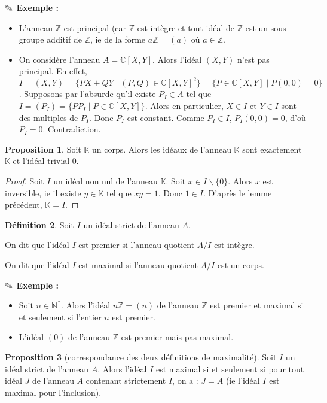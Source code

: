 \documentclass{report}
\newcommand{\Z}{\mathbb{Z}}
\newcommand{\C}{\mathbb{C}}
\newcommand{\K}{\mathbb{K}}
\newcommand{\N}{\mathbb{N}}
\theoremstyle{definition}
\newtheorem{defi}{Définition}[chapter]
\newtheorem{prop}[defi]{Proposition}
\theoremstyle{remark}
\newcommand{\exem}{{\textbf{$\text{\ding{46}}$ Exemple : \ }}}
\begin{document}
\exem 
\begin{itemize}
\item L'anneau $\Z$ est principal (car $\Z$ est intègre et tout idéal de $\Z$ est un sous-groupe additif de $\Z$, ie de la forme $a\Z=(a)$ où $a\in \Z$.
\item On considère l'anneau $A=\C[X,Y]$. Alors l'idéal $(X,Y)$ n'est pas principal. En effet, $I=(X,Y)=\{PX+QY \mid (P,Q) \in \C[X,Y]^2\}=\{P \in \C[X,Y] \mid P(0,0)=0\}$. Supposons par l'absurde qu'il existe $P_I \in A$ tel que $I=(P_I)=\{PP_I \mid P \in \C[X,Y]\}$. Alors en particulier, $X \in I$ et $Y\in I$ sont des multiples de $P_I$. Donc $P_I$ est constant. Comme $P_I \in I$, $P_I(0,0)=0$, d'où $P_I=0$. Contradiction.
\end{itemize}

\begin{prop}
Soit $ \K$ un corps. Alors les idéaux de l'anneau $\K$ sont exactement $\K$ et l'idéal trivial ${0}$.
\end{prop}

\begin{proof}
Soit $I$ un idéal non nul de l'anneau $\K$. Soit $x \in I \backslash \{0\}$. Alors $x$ est inversible, ie il existe $y \in \K$ tel que $xy=1$. Donc $1 \in I$. D'après le lemme précédent, $\K=I$.
\end{proof}

\begin{defi}
Soit $I$ un idéal strict de l'anneau $A$.
\begin{point}
\item On dit que l'idéal $I$ est premier si l'anneau quotient $A/I$ est intègre.
\item On dit que l'idéal $I$ est maximal si l'anneau quotient $A/I$ est un corps.
\end{point}
\end{defi}

\exem \begin{itemize}
\item Soit $n \in \N^*$. Alors l'idéal $n\Z=(n)$ de l'anneau $\Z$ est premier et maximal si et seulement si l'entier $n$ est premier.
\item L'idéal $(0)$ de l'anneau $\Z$ est premier mais pas maximal.
\end{itemize}

\begin{prop}[correspondance des deux définitions de maximalité]
Soit $I$ un idéal strict de l'anneau $A$. Alors l'idéal $I$ est maximal si et seulement si pour tout idéal $J$ de l'anneau $A$ contenant strictement $I$, on a : $J=A$ (ie l'idéal $I$ est maximal pour l'inclusion).
\end{prop}
\end{document}

